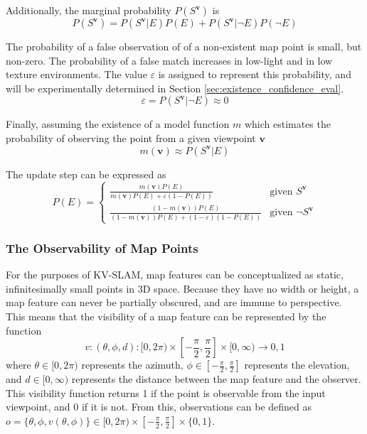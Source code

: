 Additionally, the marginal probability $P(S^{\boldsymbol{v}})$ is
$$
  P(S^{\boldsymbol{v}}) = P(S^{\boldsymbol{v}}|E)P(E) + P(S^{\boldsymbol{v}}|\neg E)P(\neg E)
$$

The probability of a false observation of of a non-existent map point is small, but non-zero. The probability of a false match increases in low-light and in low texture environments. The value $\varepsilon$ is assigned to represent this probability, and will be experimentally determined in Section \ref{sec:existence_confidence_eval}.
$$
  \varepsilon = P(S^{\boldsymbol{v}}|\neg E) \approx 0
$$

Finally, assuming the existence of a model function $m$ which estimates the probability of observing the point from a given viewpoint $\boldsymbol{v}$
$$
  m(\boldsymbol{v}) \approx P(S^{\boldsymbol{v}}|E)
$$

The update step can be expressed as
\[
  P(E) = \begin{cases}
    \frac{m(\boldsymbol{v})P(E)}{m(\boldsymbol{v})P(E) + \varepsilon(1-P(E))}             & \text{given }S^{\boldsymbol{v}}      \\
    \frac{(1-m(\boldsymbol{v}))P(E)}{(1-m(\boldsymbol{v}))P(E) + (1-\varepsilon)(1-P(E))} & \text{given }\neg S^{\boldsymbol{v}}
  \end{cases}
\]

\subsubsection{The Observability of Map Points}

For the purposes of KV-SLAM, map features can be conceptualized as static, infinitesimally small points in 3D space. Because they have no width or height, a map feature can never be partially obscured, and are immune to perspective. This means that the visibility of a map feature can be represented by the function
$$
  v:(\theta,\phi,d):[0,2\pi)\times\left[-\frac{\pi}{2},\frac{\pi}{2}\right]\times[0,\infty)\to{0,1}
$$
where $\theta\in[0,2\pi)$ represents the azimuth, $\phi\in\left[-\frac{\pi}{2},\frac{\pi}{2}\right]$ represents the elevation, and $d\in[0,\infty)$ represents the distance between the map feature and the observer. This visibility function returns 1 if the point is observable from the input viewpoint, and 0 if it is not. From this, observations can be defined as $o=\{\theta,\phi,v(\theta,\phi)\}\in[0,2\pi)\times\left[-\frac{\pi}{2},\frac{\pi}{2}\right]\times\{0,1\}$.

